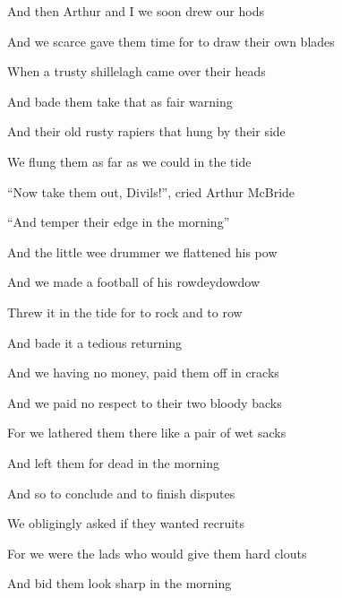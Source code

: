 \documentclass[letterpaper,10pt,english]{sphinxmanual}
\begin{document}
\begin{DUlineblock}{0em}
\item[] And then Arthur and I we soon drew our hods
\item[] And we scarce gave them time for to draw their own blades
\item[] When a trusty shillelagh came over their heads
\item[] And bade them take that as fair warning
\end{DUlineblock}

\begin{DUlineblock}{0em}
\item[] And their old rusty rapiers that hung by their side
\item[] We flung them as far as we could in the tide
\item[] “Now take them out, Divils!”, cried Arthur McBride
\item[] “And temper their edge in the morning”
\end{DUlineblock}

\begin{DUlineblock}{0em}
\item[] And the little wee drummer we flattened his pow
\item[] And we made a football of his rowdeydowdow
\item[] Threw it in the tide for to rock and to row
\item[] And bade it a tedious returning
\end{DUlineblock}

\begin{DUlineblock}{0em}
\item[] And we having no money, paid them off in cracks
\item[] And we paid no respect to their two bloody backs
\item[] For we lathered them there like a pair of wet sacks
\item[] And left them for dead in the morning
\end{DUlineblock}

\begin{DUlineblock}{0em}
\item[] And so to conclude and to finish disputes
\item[] We obligingly asked if they wanted recruits
\item[] For we were the lads who would give them hard clouts
\item[] And bid them look sharp in the morning
\end{DUlineblock}
\end{document}
